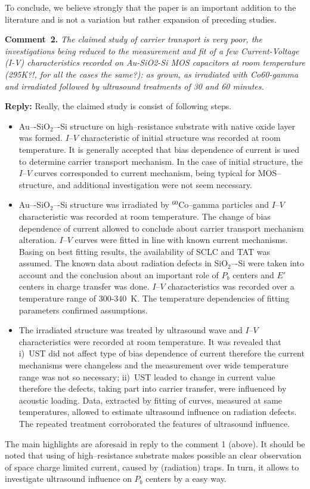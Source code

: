 \documentclass[aip,jap,preprint]{revtex4-1}
\begin{document}
To conclude, we believe strongly  that the paper is an important addition to the literature and is
not a variation but rather expansion of preceding studies.


\noindent
\textcolor[rgb]{0.00,0.50,1.00}{\textbf{Comment~2.}}
\emph{The claimed study of carrier transport is very poor, the investigations being reduced to the measurement and fit of a few Current-Voltage (I-V) characteristics recorded on Au-SiO2-Si MOS capacitors at room temperature (295K?!, for all the cases the same?): as grown, as irradiated with Co60-gamma and irradiated followed by ultrasound treatments of 30 and 60 minutes.}

\noindent
\textcolor[rgb]{0.51,0.00,0.00}{\textbf{Reply:}}
Really, the claimed study is consist of following steps.
\begin{itemize}
  \item Au–-SiO$_2$–-Si structure on high--resistance substrate with native oxide layer was formed.
      $I$--$V$ characteristic of initial structure was recorded at room temperature.
      It is generally accepted that bias dependence of current is used to determine carrier transport mechanism.
      In the case of initial structure, the $I$--$V$ curves corresponded to current mechanism, being typical for MOS--structure, and additional investigation were not seem necessary.
  \item Au–-SiO$_2$–-Si structure was irradiated by $^{60}$Co--gamma particles and $I$--$V$ characteristic was recorded at room temperature.
      The change of bias dependence of current allowed to conclude about carrier transport mechanism alteration.
      $I$--$V$ curves were fitted in line with known current mechanisms.
      Basing on best fitting results, the availability of SCLC and TAT was assumed.
      The known data about radiation defects in SiO$_2$–-Si were taken into account
      and the conclusion about an important  role of $P_b$ centers and $E'$ centers in charge transfer was done.
      $I$--$V$ characteristics was recorded  over a temperature range of 300-340~K.
      The temperature dependencies of fitting parameters confirmed assumptions.
  \item The irradiated structure was treated by ultrasound wave  and $I$--$V$ characteristics were recorded at room temperature.
       It was revealed that
       i)~UST did not affect type of bias dependence of current therefore the current mechanisms were changeless and the measurement over wide temperature range was not so necessary;
       ii)~UST leaded to change in current value therefore the defects, taking part into carrier transfer, were influenced by acoustic loading.
       Data, extracted by fitting of curves, measured at same temperatures, allowed to estimate ultrasound influence on radiation defects.
       The repeated treatment corroborated the features of ultrasound influence.
\end{itemize}
The main highlights are aforesaid in reply to the comment 1 (above).
It should be noted that using of high--resistance substrate makes possible an clear observation of space charge limited current, caused by (radiation) traps.
In turn, it allows to investigate ultrasound influence on $P_b$ centers by a easy way.
\end{document}
